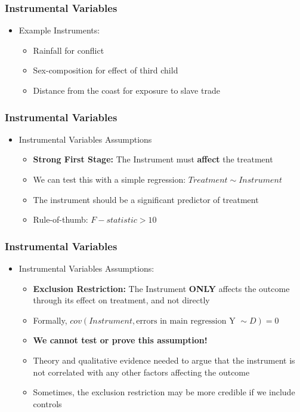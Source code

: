 \documentclass[xcolor=x11names,compress]{beamer}\usepackage[]{graphicx}\usepackage[]{color}
\renewcommand{\(}{\begin{columns}}
\renewcommand{\)}{\end{columns}}
\newcommand{\<}[1]{\begin{column}{#1}}
\renewcommand{\>}{\end{column}}
\begin{document}
\begin{frame}
\frametitle{Instrumental Variables}
\begin{itemize}
\item Example Instruments:
\begin{itemize}
\item Rainfall for conflict 
\item Sex-composition for effect of third child
\item Distance from the coast for exposure to slave trade
\end{itemize}
\end{itemize}
\end{frame}

\begin{frame}
\frametitle{Instrumental Variables}
\begin{itemize}
\item Instrumental Variables Assumptions
\begin{itemize}
\item \textbf{Strong First Stage:} The Instrument must \textbf{affect} the treatment
\pause
\item We can test this with a simple regression: $Treatment \sim Instrument$
\pause
\item The instrument should be a significant predictor of treatment
\item Rule-of-thumb: $F-statistic > 10$
\end{itemize}
\end{itemize}
\end{frame}

\begin{frame}
\frametitle{Instrumental Variables}
\begin{itemize}
\item Instrumental Variables Assumptions:
\begin{itemize}
\item \textbf{Exclusion Restriction:} The Instrument \textbf{ONLY} affects the outcome through its effect on treatment, and not directly
\pause
\item Formally, $cov(Instrument,\text{errors in main regression Y }\sim D)=0$
\pause
\item \textbf{We cannot test or prove this assumption!}
\pause
\item Theory and qualitative evidence needed to argue that the instrument is not correlated with any other factors affecting the outcome
\item Sometimes, the exclusion restriction may be more credible if we include controls
\end{itemize}
\end{itemize}
\end{frame}
\end{document}
